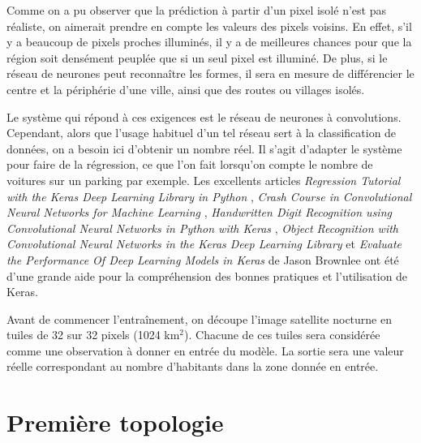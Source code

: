 \documentclass[a4paper, 11pt]{report}
\begin{document}
Comme on a pu observer que la prédiction à partir d'un pixel isolé n'est pas réaliste, on aimerait prendre en compte les valeurs des pixels voisins. En effet, s'il y a beaucoup de pixels proches illuminés, il y a de meilleures chances pour que la région soit densément peuplée que si un seul pixel est illuminé. De plus, si le réseau de neurones peut reconnaître les formes, il sera en mesure de différencier le centre et la périphérie d'une ville, ainsi que des routes ou villages isolés.

Le système qui répond à ces exigences est le réseau de neurones à convolutions. Cependant, alors que l'usage habituel d'un tel réseau sert à la classification de données, on a besoin ici d'obtenir un nombre réel. Il s'agit d'adapter le système pour faire de la régression, ce que l'on fait lorsqu'on compte le nombre de voitures sur un parking par exemple. Les excellents articles \textit{Regression Tutorial with the Keras Deep Learning Library in Python} \cite{blog-reg}, \textit{Crash Course in Convolutional Neural Networks for Machine Learning} \cite{blog-cra}, \textit{Handwritten Digit Recognition using Convolutional Neural Networks in Python with Keras} \cite{blog-han}, \textit{Object Recognition with Convolutional Neural Networks in the Keras Deep Learning Library} \cite{blog-obj} et \textit{Evaluate the Performance Of Deep Learning Models in Keras} \cite{blog-eva} de Jason Brownlee ont été d'une grande aide pour la compréhension des bonnes pratiques et l'utilisation de Keras.

Avant de commencer l'entraînement, on découpe l'image satellite nocturne en tuiles de 32 sur 32 pixels (1024 km$^2$). Chacune de ces tuiles sera considérée comme une observation à donner en entrée du modèle. La sortie sera une valeur réelle correspondant au nombre d'habitants dans la zone donnée en entrée.

\section{Première topologie}
\end{document}
